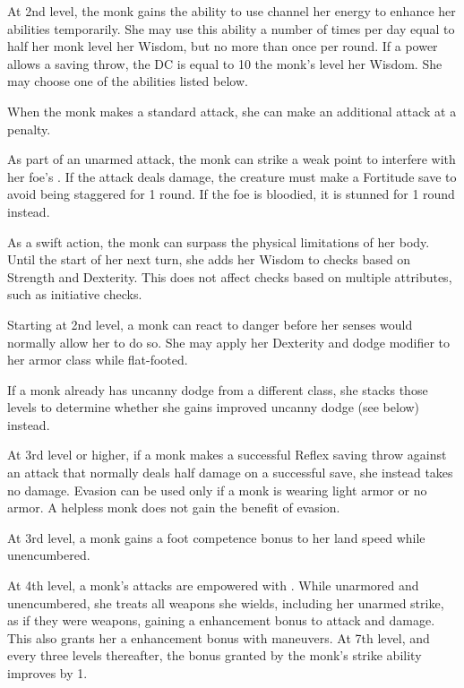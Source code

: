  At 2nd level, the monk gains the ability to use channel her \ki energy to enhance her abilities temporarily. She may use this ability a number of times per day equal to half her monk level \add her Wisdom, but no more than once per round. If a \ki power allows a saving throw, the DC is equal to 10 \add the monk's level \add her Wisdom. She may choose one of the abilities listed below.

 When the monk makes a standard attack, she can make an additional attack at a  penalty.

 As part of an unarmed attack, the monk can strike a weak point to interfere with her foe's \ki. If the attack deals damage, the creature must make a Fortitude save to avoid being staggered for 1 round. If the foe is bloodied, it is stunned for 1 round instead.

 As a swift action, the monk can surpass the physical limitations of her body. Until the start of her next turn, she adds her Wisdom to checks based on Strength and Dexterity. This does not affect checks based on multiple attributes, such as initiative checks.

 Starting at 2nd level, a monk can react to danger before her senses would normally allow her to do so. She may apply her Dexterity and dodge modifier to her armor class while flat-footed.

If a monk already has uncanny dodge from a different class, she stacks those levels to determine whether she gains improved uncanny dodge (see below) instead.

 At 3rd level or higher, if a monk makes a successful Reflex saving throw against an attack that normally deals half damage on a successful save, she instead takes no damage. Evasion can be used only if a monk is wearing light armor or no armor. A helpless monk does not gain the benefit of evasion.

 At 3rd level, a monk gains a  foot competence bonus to her land speed while unencumbered.

 At 4th level, a monk's attacks are empowered with \ki. While unarmored and unencumbered, she treats all weapons she wields, including her unarmed strike, as if they were  weapons, gaining a  enhancement bonus to attack and damage. This also grants her a  enhancement bonus with maneuvers. At 7th level, and every three levels thereafter, the bonus granted by the monk's \ki strike ability improves by 1. 

